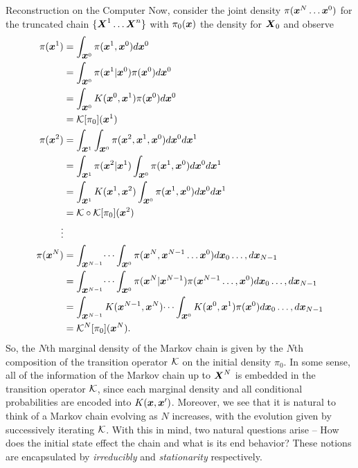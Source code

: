 \begin{chapter}{Reconstruction on the Computer}
Now, consider the joint density $\pi(\mbox{\boldmath$x$}^N\dots \mbox{\boldmath$x$}^0)$ for the truncated chain $\{\mbox{\boldmath$X$}^1\dots \mbox{\boldmath$X$}^n\}$ with $\pi_0(\mbox{\boldmath$x$})$ the density for $\mbox{\boldmath$X$}_0$ and observe 
\begin{align} 
  \pi(\mbox{\boldmath$x$}^1) 
    &= \int_{\mbox{\boldmath$x$}^0} \pi(\mbox{\boldmath$x$}^1,\mbox{\boldmath$x$}^0) d\mbox{\boldmath$x$}^0 \nonumber\\
    &= \int_{\mbox{\boldmath$x$}^0} \pi(\mbox{\boldmath$x$}^1|\mbox{\boldmath$x$}^0)\pi( \mbox{\boldmath$x$}^0) d\mbox{\boldmath$x$}^0 \nonumber\\
    &= \int_{\mbox{\boldmath$x$}^0} K(\mbox{\boldmath$x$}^0,\mbox{\boldmath$x$}^1)\pi( \mbox{\boldmath$x$}^0) d\mbox{\boldmath$x$}^0\nonumber\\
    &= \mathcal K [\pi_0](\mbox{\boldmath$x$}^1) \\
  \pi(\mbox{\boldmath$x$}^2) 
    &= \int_{\mbox{\boldmath$x$}^1}\int_{\mbox{\boldmath$x$}^0} \pi(\mbox{\boldmath$x$}^2,\mbox{\boldmath$x$}^1,\mbox{\boldmath$x$}^0) d\mbox{\boldmath$x$}^0 d\mbox{\boldmath$x$}^1\nonumber\\
    &= \int_{\mbox{\boldmath$x$}^1}\pi(\mbox{\boldmath$x$}^2|\mbox{\boldmath$x$}^1)\int_{\mbox{\boldmath$x$}^0} \pi(\mbox{\boldmath$x$}^1,\mbox{\boldmath$x$}^0) d\mbox{\boldmath$x$}^0 d\mbox{\boldmath$x$}^1\nonumber\\
    &= \int_{\mbox{\boldmath$x$}^1}K(\mbox{\boldmath$x$}^1,\mbox{\boldmath$x$}^2)\int_{\mbox{\boldmath$x$}^0} \pi(\mbox{\boldmath$x$}^1,\mbox{\boldmath$x$}^0) d\mbox{\boldmath$x$}^0 d\mbox{\boldmath$x$}^1\nonumber\\
    &= \mathcal K \circ \mathcal K [\pi_0](\mbox{\boldmath$x$}^2)\\
    \vdots\nonumber\\
  \pi(\mbox{\boldmath$x$}^N)  
    &= \int_{\mbox{\boldmath$x$}^{N-1}}\dots\int_{\mbox{\boldmath$x$}^0} \pi(\mbox{\boldmath$x$}^N, \mbox{\boldmath$x$}^{N-1}\dots \mbox{\boldmath$x$}^0)d\mbox{\boldmath$x$}_0\dots,d\mbox{\boldmath$x$}_{N-1}\nonumber\\
    &= \int_{\mbox{\boldmath$x$}^{N-1}}\dots\int_{\mbox{\boldmath$x$}^0} \pi(\mbox{\boldmath$x$}^N| \mbox{\boldmath$x$}^{N-1})\pi(\mbox{\boldmath$x$}^{N-1}\dots,\mbox{\boldmath$x$}^0)d\mbox{\boldmath$x$}_0\dots,d\mbox{\boldmath$x$}_{N-1} \nonumber\\
    &= \int_{\mbox{\boldmath$x$}^{N-1}}K( \mbox{\boldmath$x$}^{N-1},\mbox{\boldmath$x$}^N)\dots\int_{\mbox{\boldmath$x$}^0} K(\mbox{\boldmath$x$}^0,\mbox{\boldmath$x$}^1)\pi(\mbox{\boldmath$x$}^0)d\mbox{\boldmath$x$}_0\dots,d\mbox{\boldmath$x$}_{N-1} \nonumber\\
    &= \mathcal K^N [\pi_0](\mbox{\boldmath$x$}^N).
\end{align}
So, the $N$th marginal density of the Markov chain is given by the $N$th composition of the transition operator $\mathcal K$ on the initial density $\pi_0$.
In some sense, all of the information of the Markov chain up to $\mbox{\boldmath$X$}^N$ is embedded in the transition operator $\mathcal K$, since each marginal density and all conditional probabilities are encoded into $K(\mbox{\boldmath$x$}, \mbox{\boldmath$x$}')$.
Moreover, we see that it is natural to think of a Markov chain evolving as $N$ increases, with the evolution given by successively iterating $\mathcal K$.
With this in mind, two natural questions arise -- How does the initial state effect the chain and what is its end behavior? 
These notions are encapsulated by \emph{irreducibly} and \emph{stationarity} respectively.


\end{chapter}
